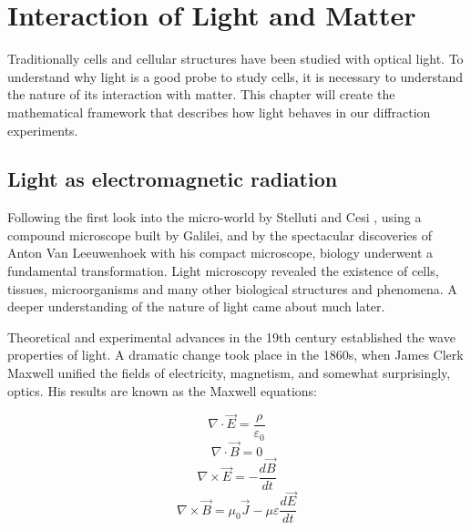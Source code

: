 
\chapter{Interaction of Light and Matter}
Traditionally cells and cellular structures have been studied with optical light. To understand why light is a good probe to study cells, it is necessary to understand the nature of its interaction with matter. This chapter will create the mathematical framework that describes how light behaves in our diffraction experiments. 

\section{Light as electromagnetic radiation}
Following the first look into the micro-world by Stelluti and Cesi \cite{Stelluti1625}, using a compound microscope built by Galilei, and by the spectacular discoveries of Anton Van Leeuwenhoek with his compact microscope\cite{VanLeeuwenhoek1676}, biology underwent a fundamental transformation. Light microscopy revealed the existence of cells, tissues, microorganisms and many other biological structures and phenomena. A deeper understanding of the nature of light came about much later.

Theoretical and experimental advances in the 19th century established the wave properties of light. A dramatic change took place in the 1860s, when James Clerk Maxwell unified the fields of electricity, magnetism, and somewhat surprisingly, optics. His results are known as the Maxwell equations:

\begin{equation} \nabla \cdot   \vec{E} = \frac{\rho}{\varepsilon_0 }\label{eq:maxlaw1}\end{equation}
\begin{equation} \nabla \cdot   \vec{B} = 0 \label{eq:maxlaw2}\end{equation}
\begin{equation} \nabla \times \vec{E} = -\frac{d\vec{B}}{dt}\label{eq:maxlaw3}\end{equation}
\begin{equation} \nabla \times \vec{B} = \mu_0 \vec{J} -\mu\varepsilon\frac{d\vec{E}}{dt}\label{eq:maxlaw4}\end{equation}

